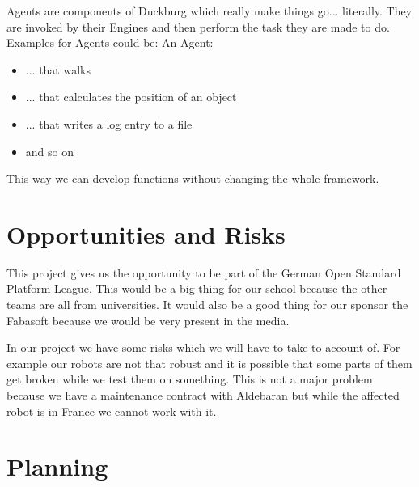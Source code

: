 \documentclass[12pt]{article}
\theoremstyle{definition}
\begin{document}
\pagebreak



Agents are components of Duckburg which really make things go... literally. They are invoked by their Engines and then perform the task they are made to do. Examples for Agents could be: An Agent:
\begin{itemize}
\item ... that walks
\item ... that calculates the position of an object 
\item ... that writes a log entry to a file
\item and so on
\end{itemize}
This way we can develop functions without changing the whole framework.\linebreak

\pagebreak
\section{Opportunities and Risks}

This project gives us the opportunity to be part of the German Open Standard Platform League. This would be a big thing for our school because the other teams are all from universities. It would also be a good thing for our sponsor the Fabasoft because we would be very present in the media. \newline



In our project we have some risks which we will have to take to account of. For example our robots are not that robust and it is possible that some parts of them get broken while we test them on something. This is not a major problem because we have a maintenance contract with Aldebaran but while the affected robot is in France we cannot work with it.  


\pagebreak
\section{Planning}
\end{document}
